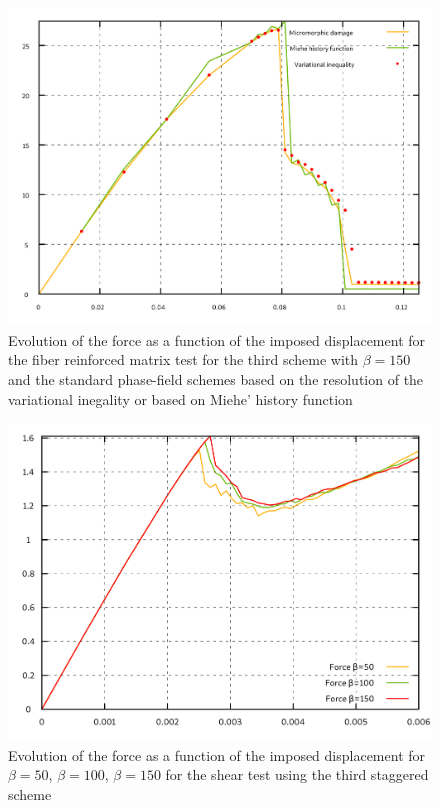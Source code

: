 \begin{figure}[H]
  \centering
  \includegraphics[width=10.cm]{../chapter_02_ef_micromorphic/figures/FiberReinforcedMatrix-force.pdf}
  \caption{Evolution of the force as a function of the imposed displacement for
  the fiber reinforced matrix test for the third scheme with \(\beta=150\)
  and the standard phase-field schemes based on the resolution of the
  variational inegality or based on Miehe' history
  function}
  \label{fig:micromorphic_damage:force}
\end{figure}


\begin{figure}[H]
  \centering
  \includegraphics[width=10.cm]{../chapter_02_ef_micromorphic/figures/shear-force.pdf}
  \caption{Evolution of the force as a function of the imposed displacement for
  \(\beta=50\), \(\beta=100\), \(\beta=150\) for the shear test using the
  third staggered scheme}
  \label{fig:micromorphic_damage:beta}
\end{figure}

